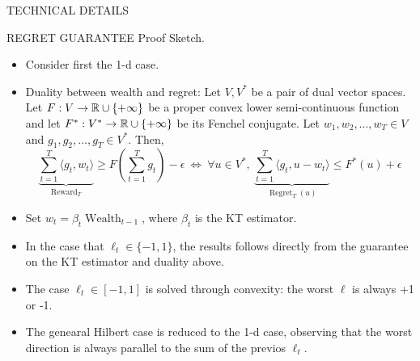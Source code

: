 \documentclass[final,t,serif,mathserif]{beamer}
\DeclareMathOperator{\Wealth}{Wealth}
\DeclareMathOperator{\Regret}{Regret}
\DeclareMathOperator{\Reward}{Reward}
\def\spaziooo{\vspace{-0.cm}}
\begin{document}
\begin{frame}{}
\begin{columns}[t]
\begin{column}{.33\linewidth}
\begin{block}{TECHNICAL DETAILS}
\begin{minipage}{.98\linewidth}
\begin{block}{REGRET GUARANTEE}
    \alert{Proof Sketch.}
    \begin{itemize}
    \item Consider first the 1-d case.
    \item Duality between wealth and regret: Let $V,V^*$ be a pair of dual vector spaces. Let $F:V \to \mathbb{R} \cup \{+\infty\}$ be a proper convex lower semi-continuous function and let $F^*:V^* \to \mathbb{R} \cup \{+\infty\}$ be its Fenchel conjugate. Let $w_1, w_2, \dots, w_T \in V$ and $g_1, g_2, \dots, g_T \in V^*$.  Then,
    \[
      \underbrace{\sum_{t=1}^T \langle g_t, w_t \rangle}_{\Reward_T} \ge F\left( \sum_{t=1}^T g_t \right) -\epsilon
      \ \Leftrightarrow \ 
      \forall u \in V^*, \
      \underbrace{\sum_{t=1}^T \langle g_t, u - w_t\rangle}_{\Regret_T(u)} \le F^*(u) + \epsilon
    \]
    \item Set $w_t=\beta_t \Wealth_{t-1}$, where $\beta_t$ is the KT estimator.
    \item In the case that $\ell_t \in \{-1,1\}$, the results follows directly from the guarantee on the KT estimator and duality above.
    \item The case $\ell_t \in [-1,1]$ is solved through convexity: the worst $\ell$ is always +1 or -1.
    \item The genearal Hilbert case is reduced to the 1-d case, observing that the worst direction is always parallel to the sum of the previos $\ell_t$.
    \end{itemize}    
    \spaziooo
    \end{block}
    \end{minipage}
    \end{block}

    
  \end{column}
\end{columns}
\end{frame}
\end{document}
